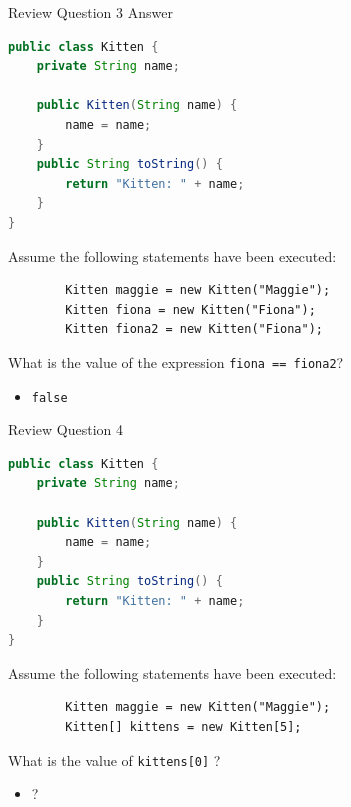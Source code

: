 \documentclass{beamer}
\begin{document}
\begin{frame}[fragile]{Review Question 3 Answer}
\vspace{-.05in}
\begin{lstlisting}[language=Java]
public class Kitten {
    private String name;

    public Kitten(String name) {
        name = name;
    }
    public String toString() {
        return "Kitten: " + name;
    }
}
\end{lstlisting}
\vspace{-.05in}
Assume the following statements have been executed:
\vspace{-.05in}
\begin{lstlisting}
        Kitten maggie = new Kitten("Maggie");
        Kitten fiona = new Kitten("Fiona");
        Kitten fiona2 = new Kitten("Fiona");
\end{lstlisting}
\vspace{-.05in}
What is the value of the expression {\tt fiona == fiona2}?
\begin{itemize}
\itemsep0em
\item {\tt false}
\end{itemize}
\end{frame}

\begin{frame}[fragile]{Review Question 4}
\vspace{-.05in}
\begin{lstlisting}[language=Java]
public class Kitten {
    private String name;

    public Kitten(String name) {
        name = name;
    }
    public String toString() {
        return "Kitten: " + name;
    }
}
\end{lstlisting}
\vspace{-.05in}
Assume the following statements have been executed:
\vspace{-.05in}
\begin{lstlisting}
        Kitten maggie = new Kitten("Maggie");
        Kitten[] kittens = new Kitten[5];
\end{lstlisting}
\vspace{-.05in}
What is the value of {\tt kittens[0]} ?
\begin{itemize}
\itemsep0em
\item ?
\end{itemize}
\end{frame}
\end{document}
